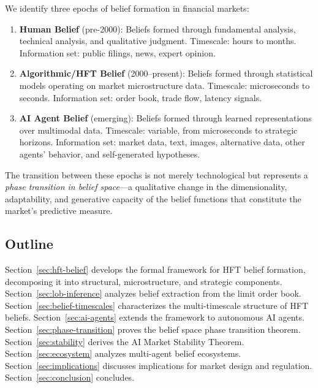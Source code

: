 \documentclass[12pt,a4paper]{article}
\theoremstyle{definition}
\begin{document}
We identify three epochs of belief formation in financial markets:

\begin{enumerate}[label=\textbf{Epoch \Roman*.}, leftmargin=*]
  \item \textbf{Human Belief} (pre-2000): Beliefs formed through fundamental analysis, technical analysis, and qualitative judgment. Timescale: hours to months. Information set: public filings, news, expert opinion.

  \item \textbf{Algorithmic/HFT Belief} (2000--present): Beliefs formed through statistical models operating on market microstructure data. Timescale: microseconds to seconds. Information set: order book, trade flow, latency signals.

  \item \textbf{AI Agent Belief} (emerging): Beliefs formed through learned representations over multimodal data. Timescale: variable, from microseconds to strategic horizons. Information set: market data, text, images, alternative data, other agents' behavior, and self-generated hypotheses.
\end{enumerate}

The transition between these epochs is not merely technological but represents a \emph{phase transition in belief space}---a qualitative change in the dimensionality, adaptability, and generative capacity of the belief functions that constitute the market's predictive measure.

\subsection{Outline}

Section~\ref{sec:hft-belief} develops the formal framework for HFT belief formation, decomposing it into structural, microstructure, and strategic components. Section~\ref{sec:lob-inference} analyzes belief extraction from the limit order book. Section~\ref{sec:belief-timescales} characterizes the multi-timescale structure of HFT beliefs. Section~\ref{sec:ai-agents} extends the framework to autonomous AI agents. Section~\ref{sec:phase-transition} proves the belief space phase transition theorem. Section~\ref{sec:stability} derives the AI Market Stability Theorem. Section~\ref{sec:ecosystem} analyzes multi-agent belief ecosystems. Section~\ref{sec:implications} discusses implications for market design and regulation. Section~\ref{sec:conclusion} concludes.
\end{document}
